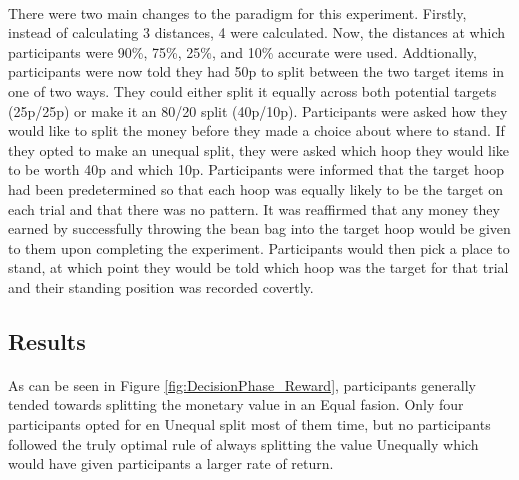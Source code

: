 \documentclass[12pt]{article}
\begin{document}
\paragraph{} There were two main changes to the paradigm for this experiment. Firstly, instead of calculating 3 distances, 4 were calculated. Now, the distances at which participants were 90\%, 75\%, 25\%, and 10\% accurate were used. Addtionally, participants were now told they had 50p to split between the two target items in one of two ways. They could either split it equally across both potential targets (25p/25p) or make it an 80/20 split (40p/10p). Participants were asked how they would like to split the money before they made a choice about where to stand. If they opted to make an unequal split, they were asked which hoop they would like to be worth 40p and which 10p. Participants were informed that the target hoop had been predetermined so that each hoop was equally likely to be the target on each trial and that there was no pattern. It was reaffirmed that any money they earned by successfully throwing the bean bag into the target hoop would be given to them upon completing the experiment. Participants would then pick a place to stand, at which point they would be told which hoop was the target for that trial and their standing position was recorded covertly. 


\subsection*{Results}

\paragraph{} As can be seen in Figure \ref{fig:DecisionPhase_Reward}, participants generally tended towards splitting the monetary value in an Equal fasion. Only four participants opted for en Unequal split most of them time, but no participants followed the truly optimal rule of always splitting the value Unequally which would have given participants a larger rate of return. 
\end{document}
